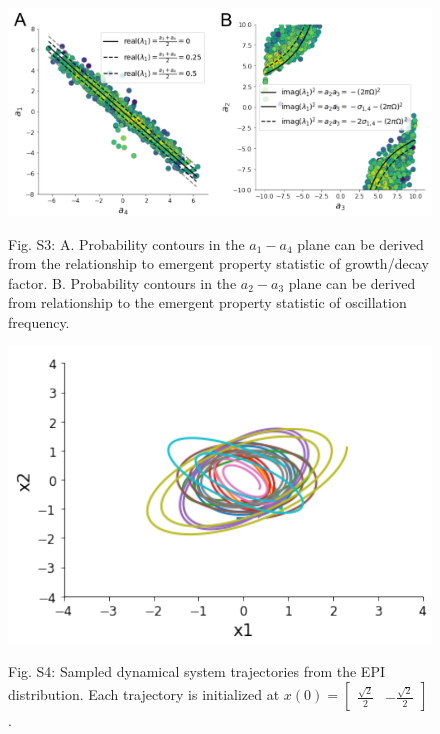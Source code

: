 \documentclass[11pt]{article}
\begin{document}
\begin{figure}
\begin{center}
\includegraphics[scale=0.5]{figures/figS3/figS3.pdf}
\end{center}
\begin{flushleft}
Fig. S3: A. Probability contours in the $a_1-a_4$ plane can be derived from the relationship to emergent property statistic of growth/decay factor. B. Probability contours in the $a_2-a_3$ plane can be derived from relationship to the emergent property statistic of oscillation frequency.
\end{flushleft}
\end{figure}

\begin{figure}
\begin{center}
\includegraphics[scale=0.5]{figures/figS4/figS4.pdf}
\end{center}
\begin{flushleft}
Fig. S4: Sampled dynamical system trajectories from the EPI distribution.  Each trajectory is initialized at $x(0) = \begin{bmatrix} \frac{\sqrt{2}}{2} & -\frac{\sqrt{2}}{2} \end{bmatrix}$.
\end{flushleft}
\end{figure}
\end{document}
